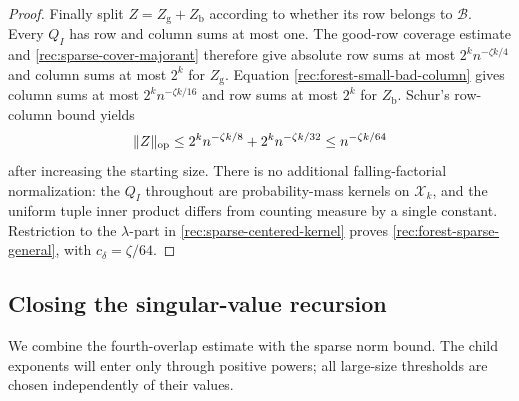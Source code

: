 \begin{proof}
Finally split $Z=Z_{\mathrm g}+Z_{\mathrm b}$ according
to whether its row belongs to $\mathcal B$.
Every $Q_I$ has row and column sums at most one.
The good-row coverage estimate and
\eqref{rec:sparse-cover-majorant} therefore give absolute
row sums at most $2^k n^{-\zeta k/4}$ and column sums at
most $2^k$ for $Z_{\mathrm g}$.
Equation \eqref{rec:forest-small-bad-column} gives column
sums at most $2^k n^{-\zeta k/16}$ and row sums at most
$2^k$ for $Z_{\mathrm b}$.
Schur's row-column bound yields
\[
 \|Z\|_{\mathrm{op}}
 \le2^k n^{-\zeta k/8}+2^k n^{-\zeta k/32}
 \le n^{-\zeta k/64}
\]
after increasing the starting size.
There is no additional falling-factorial normalization:
the $Q_I$ throughout are probability-mass kernels on
$\mathcal X_k$, and the uniform tuple inner product
differs from counting measure by a single constant.
Restriction to the $\lambda$-part in
\eqref{rec:sparse-centered-kernel} proves
\eqref{rec:forest-sparse-general}, with
$c_\delta=\zeta/64$.
\end{proof}

\subsection{Closing the singular-value recursion}

We combine the fourth-overlap estimate with the sparse norm bound.
The child exponents will enter only through positive powers; all
large-size thresholds are chosen independently of their values.

